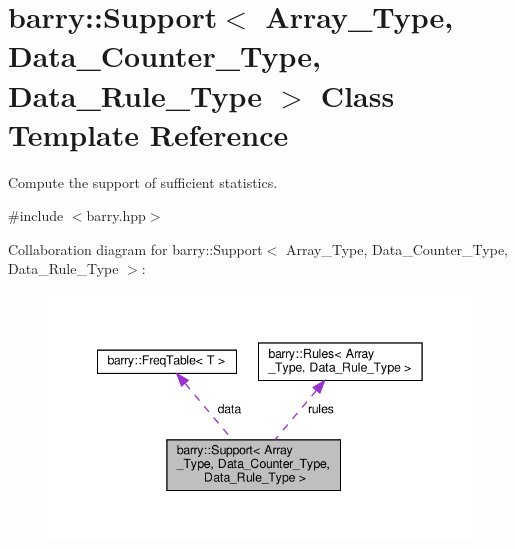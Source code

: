 \hypertarget{classbarry_1_1_support}{}\section{barry\+:\+:Support$<$ Array\+\_\+\+Type, Data\+\_\+\+Counter\+\_\+\+Type, Data\+\_\+\+Rule\+\_\+\+Type $>$ Class Template Reference}
\label{classbarry_1_1_support}


Compute the support of sufficient statistics.  




{\ttfamily \#include $<$barry.\+hpp$>$}



Collaboration diagram for barry\+:\+:Support$<$ Array\+\_\+\+Type, Data\+\_\+\+Counter\+\_\+\+Type, Data\+\_\+\+Rule\+\_\+\+Type $>$\+:\nopagebreak
\begin{figure}[H]
\begin{center}
\leavevmode
\includegraphics[width=342pt]{classbarry_1_1_support__coll__graph}
\end{center}
\end{figure}
